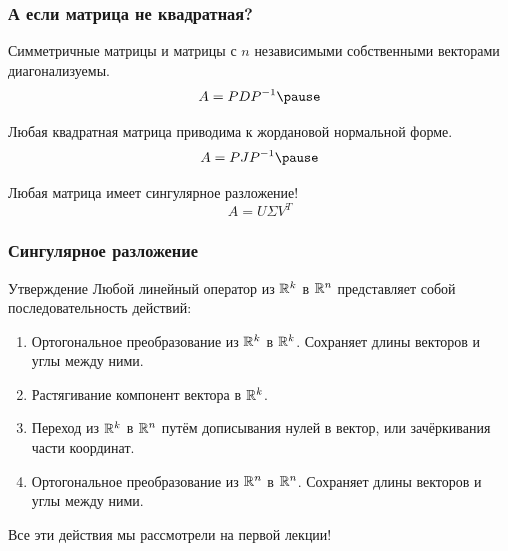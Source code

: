 
    



\begin{frame}
  \frametitle{А если матрица не квадратная?}

  Симметричные матрицы и матрицы с $n$ независимыми собственными векторами диагонализуемы. 
  \[
  A = PDP^{-1}  \pause
  \]

  Любая квадратная матрица приводима к жордановой нормальной форме. 
  \[
  A = PJP^{-1} \pause
  \]

  Любая матрица имеет сингулярное разложение!
  \[
  A = U\Sigma V^T
  \]

\end{frame}

\begin{frame}
  \frametitle{Сингулярное разложение}

  \begin{block}{Утверждение}
    Любой линейный оператор из $\mathbb{R}^k$ в $\mathbb{R}^n$ представляет собой последовательность действий: \pause

    \begin{enumerate}
      \item Ортогональное преобразование из $\mathbb{R}^k$ в $\mathbb{R}^k$. Сохраняет длины векторов и углы между ними. \pause
      \item Растягивание компонент вектора в $\mathbb{R}^k$. \pause
      \item Переход из $\mathbb{R}^k$ в $\mathbb{R}^n$ путём дописывания нулей в вектор, или зачёркивания части координат. \pause
      \item Ортогональное преобразование из $\mathbb{R}^n$ в $\mathbb{R}^n$. Сохраняет длины векторов и углы между ними. \pause
    \end{enumerate}  
  \end{block}

  Все эти действия мы рассмотрели на первой лекции!

\end{frame}


